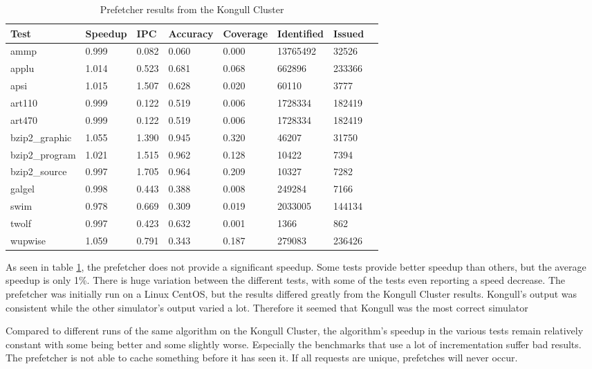 \begin{table}[!t]
\renewcommand{\arraystretch}{1.3}
\caption{Prefetcher results from the Kongull Cluster}
\label{table:results}
\centering
\begin{tabular}{|l|l|l|l|l|l|l|l|}
\hline
\bfseries Test & \bfseries Speedup & \bfseries IPC & \bfseries Accuracy & \bfseries Coverage & \bfseries Identified & \bfseries Issued\\
\hline
\hline
ammp 		& 0.999 & 0.082 & 0.060 & 0.000 & 13765492 & 32526\\
applu 		& 1.014 & 0.523 & 0.681 & 0.068 & 662896   & 233366\\
apsi 		& 1.015 & 1.507 & 0.628 & 0.020 & 60110    & 3777\\	
art110 		& 0.999 & 0.122 & 0.519 & 0.006 & 1728334  & 182419\\	
art470 		& 0.999 & 0.122 & 0.519 & 0.006 & 1728334  & 182419\\
bzip2\_graphic 	& 1.055 & 1.390 & 0.945 & 0.320 & 46207    & 31750\\
bzip2\_program 	& 1.021 & 1.515 & 0.962 & 0.128 & 10422    & 7394\\
bzip2\_source 	& 0.997 & 1.705 & 0.964 & 0.209 & 10327    & 7282\\
galgel 		& 0.998 & 0.443 & 0.388 & 0.008 & 249284   & 7166\\
swim 		& 0.978 & 0.669 & 0.309 & 0.019 & 2033005  & 144134\\
twolf 		& 0.997 & 0.423 & 0.632 & 0.001 & 1366 	   & 862	\\
wupwise 	& 1.059 & 0.791 & 0.343 & 0.187 & 279083   & 236426\\
\hline
\end{tabular}
\end{table}

As seen in table \ref{table:results}, the prefetcher does not provide a significant speedup. Some tests provide better speedup than others, but the average speedup is only 1\%. There is huge variation between the different tests, with some of the tests even reporting a speed decrease. The prefetcher was initially run on a Linux CentOS, but the results differed greatly from the Kongull Cluster results. Kongull's output was consistent while the other simulator's output varied a lot. Therefore it seemed that Kongull was the most correct simulator

Compared to different runs of the same algorithm on the Kongull Cluster, the algorithm's speedup in the various tests remain relatively constant with some being better and some slightly worse. Especially the benchmarks that use a lot of incrementation suffer bad results. The prefetcher is not able to cache something before it has seen it. If all requests are unique, prefetches will never occur.

